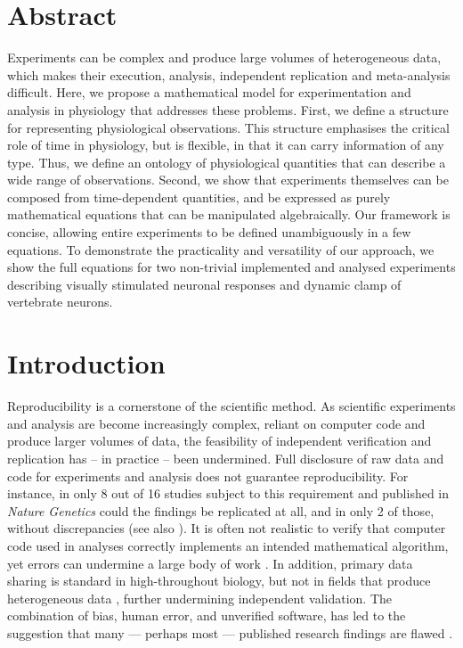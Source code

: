 
\section*{Abstract}

Experiments can be complex and produce large volumes of heterogeneous
data, which makes their execution, analysis, independent replication
and meta-analysis difficult. Here, we propose a mathematical model for
experimentation and analysis in physiology that addresses these
problems. First, we define a structure for representing physiological
observations. This structure emphasises the critical role of time in
physiology, but is flexible, in that it can carry information of any
type. Thus, we define an ontology of physiological quantities that can
describe a wide range of observations. Second, we show that
experiments themselves can be composed from time-dependent quantities,
and be expressed as purely mathematical equations that can be
manipulated algebraically. Our framework is concise, allowing entire
experiments to be defined unambiguously in a few equations. To
demonstrate the practicality and versatility of our approach, we show
the full equations for two non-trivial implemented and analysed
experiments describing visually stimulated neuronal responses and
dynamic clamp of vertebrate neurons. 

\pagebreak

\section*{Introduction}

Reproducibility is a cornerstone of the scientific method. As
scientific experiments and analysis are become increasingly complex,
reliant on computer code and produce larger volumes of data, the
feasibility of independent verification and replication has -- in
practice -- been undermined. Full disclosure of raw data and code for
experiments and analysis does not guarantee reproducibility.  For
instance, in only 8 out of 16 studies subject to this requirement and
published in \emph{Nature Genetics} could the findings be replicated
at all, and in only 2 of those, without discrepancies
\cite{Ioannidis2008} (see also \cite{Baggerly2009,
  McCullough2007}). It is often not realistic to verify that computer
code used in analyses correctly implements an intended mathematical
algorithm, yet errors can undermine a large body of work
\cite{Chang2006}.  In addition, primary data sharing is standard in
high-throughout biology, but not in fields that produce heterogeneous
data \cite{Gardner2005}, further undermining independent validation.
The combination of bias, human error, and unverified software, has led
to the suggestion that many --- perhaps most --- published research
findings are flawed \cite{Ioannidis2005, Merali2010}.

